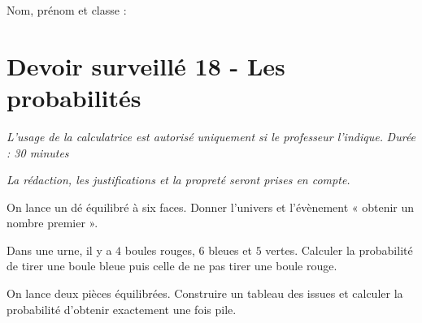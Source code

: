 \documentclass[a4paper,10pt]{report}
\begin{document}
\pagestyle{empty}
\noindent Nom, prénom et classe : \dotfill

\section*{Devoir surveillé 18 - Les probabilités}

\noindent \textit{L'usage de la calculatrice est autorisé uniquement si le professeur l'indique.} \hfill \textit{Durée : 30 minutes}

\medskip
\noindent \textit{La rédaction, les justifications et la propreté seront prises en compte.}


\begin{ex}[Univers]
On lance un dé équilibré à six faces. Donner l'univers et l'évènement « obtenir un nombre premier ».
\medskip\noindent\grandscarreaux{\linewidth}{2.5cm}
\end{ex}
\begin{ex}[Calcul]
Dans une urne, il y a $4$ boules rouges, $6$ bleues et $5$ vertes. Calculer la probabilité de tirer une boule bleue puis celle de ne pas tirer une boule rouge.
\medskip\noindent\grandscarreaux{\linewidth}{4cm}
\end{ex}
\begin{ex}
On lance deux pièces équilibrées. Construire un tableau des issues et calculer la probabilité d'obtenir exactement une fois pile.
\medskip\noindent\grandscarreaux{\linewidth}{5cm}
\end{ex}
\end{document}
